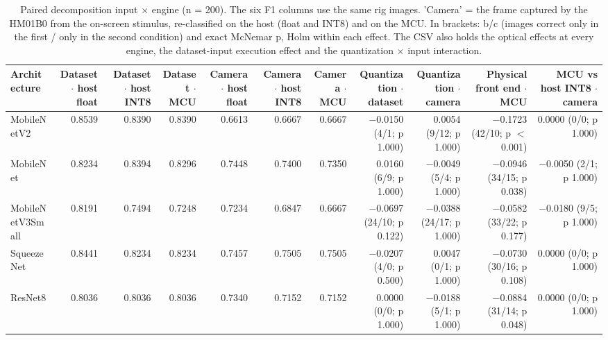 \begin{table}[htbp]
\centering
\scriptsize
\caption{Paired decomposition input $\times$ engine (n = 200). The six F1 columns use the same rig images. 'Camera' = the frame captured by the HM01B0 from the on-screen stimulus, re-classified on the host (float and INT8) and on the MCU. In brackets: b/c (images correct only in the first / only in the second condition) and exact McNemar p, Holm within each effect. The CSV also holds the optical effects at every engine, the dataset-input execution effect and the quantization $\times$ input interaction.}
\label{tab:ladder-coco-2}
\begin{tabular}{lrrrrrrrrrr}
\toprule
Architecture & Dataset $\cdot$ host float & Dataset $\cdot$ host INT8 & Dataset $\cdot$ MCU & Camera $\cdot$ host float & Camera $\cdot$ host INT8 & Camera $\cdot$ MCU & Quantization $\cdot$ dataset & Quantization $\cdot$ camera & Physical front end $\cdot$ MCU & MCU vs host INT8 $\cdot$ camera \\
\midrule
MobileNetV2 & 0.8539 & 0.8390 & 0.8390 & 0.6613 & 0.6667 & 0.6667 & $-$0.0150 (4/1; p 1.000) & 0.0054 (9/12; p 1.000) & $-$0.1723 (42/10; p $<$0.001) & 0.0000 (0/0; p 1.000) \\
MobileNet & 0.8234 & 0.8394 & 0.8296 & 0.7448 & 0.7400 & 0.7350 & 0.0160 (6/9; p 1.000) & $-$0.0049 (5/4; p 1.000) & $-$0.0946 (34/15; p 0.038) & $-$0.0050 (2/1; p 1.000) \\
MobileNetV3Small & 0.8191 & 0.7494 & 0.7248 & 0.7234 & 0.6847 & 0.6667 & $-$0.0697 (24/10; p 0.122) & $-$0.0388 (24/17; p 1.000) & $-$0.0582 (33/22; p 0.177) & $-$0.0180 (9/5; p 1.000) \\
SqueezeNet & 0.8441 & 0.8234 & 0.8234 & 0.7457 & 0.7505 & 0.7505 & $-$0.0207 (4/0; p 0.500) & 0.0047 (0/1; p 1.000) & $-$0.0730 (30/16; p 0.108) & 0.0000 (0/0; p 1.000) \\
ResNet8 & 0.8036 & 0.8036 & 0.8036 & 0.7340 & 0.7152 & 0.7152 & 0.0000 (0/0; p 1.000) & $-$0.0188 (5/1; p 1.000) & $-$0.0884 (31/14; p 0.048) & 0.0000 (0/0; p 1.000) \\
\bottomrule
\end{tabular}
\end{table}

